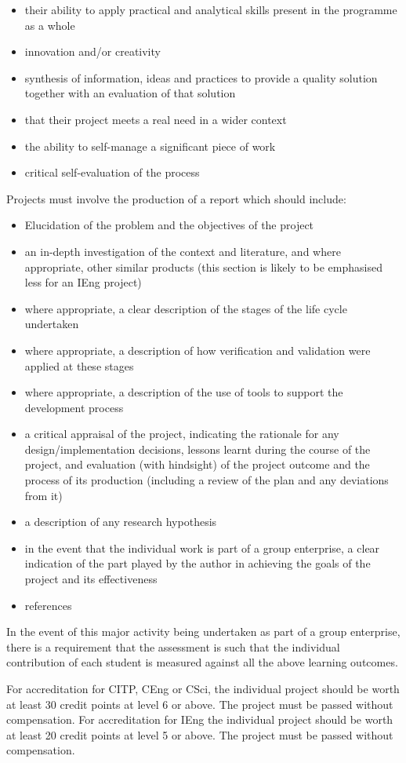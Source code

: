 \documentclass{../fal_assignment}
\begin{document}
\begin{itemize}
\item their ability to apply practical and analytical skills present in the programme as a whole
\item innovation and/or creativity
\item synthesis of information, ideas and practices to provide a quality solution together with an evaluation of that solution
\item that their project meets a real need in a wider context
\item the ability to self-manage a significant piece of work
\item critical self-evaluation of the process
\end{itemize}

Projects must involve the production of a report which should include:

\begin{itemize}
\item Elucidation of the problem and the objectives of the project
\item an in-depth investigation of the context and literature, and where appropriate, other similar products (this section is
likely to be emphasised less for an IEng project)
\item where appropriate, a clear description of the stages of the life cycle undertaken
\item where appropriate, a description of how verification and validation were applied at these stages
\item where appropriate, a description of the use of tools to support the development process
\item a critical appraisal of the project, indicating the rationale for any design/implementation decisions, lessons learnt
during the course of the project, and evaluation (with hindsight) of the project outcome and the process of its
production (including a review of the plan and any deviations from it)
\item a description of any research hypothesis
\item in the event that the individual work is part of a group enterprise, a clear indication of the part played by the author in
achieving the goals of the project and its effectiveness
\item references 
\end{itemize}

In the event of this major activity being undertaken as part of a group enterprise, there is a requirement that the
assessment is such that the individual contribution of each student is measured against all the above learning
outcomes.

For accreditation for CITP, CEng or CSci, the individual project should be worth at least 30 credit points at level 6 or
above. The project must be passed without compensation.
For accreditation for IEng the individual project should be worth at least 20 credit points at level 5 or above. The project
must be passed without compensation. 
\end{document}
